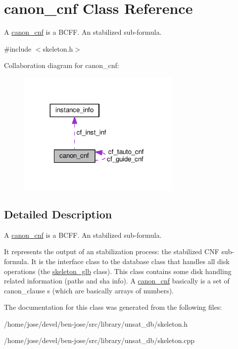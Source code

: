 \hypertarget{classcanon__cnf}{\section{canon\+\_\+cnf Class Reference}
\label{classcanon__cnf}
}


A \hyperlink{classcanon__cnf}{canon\+\_\+cnf} is a B\+C\+F\+F. An stabilized sub-\/formula.  




{\ttfamily \#include $<$skeleton.\+h$>$}



Collaboration diagram for canon\+\_\+cnf\+:\nopagebreak
\begin{figure}[H]
\begin{center}
\leavevmode
\includegraphics[width=224pt]{d3/d0b/classcanon__cnf__coll__graph}
\end{center}
\end{figure}


\subsection{Detailed Description}
A \hyperlink{classcanon__cnf}{canon\+\_\+cnf} is a B\+C\+F\+F. An stabilized sub-\/formula. 

It represents the output of an stabilization process\+: the stabilized C\+N\+F sub-\/formula. It is the interface class to the database class that handles all disk operations (the \hyperlink{classskeleton__glb}{skeleton\+\_\+glb} class). This class contains some disk handling related information (paths and sha info). A \hyperlink{classcanon__cnf}{canon\+\_\+cnf} basically is a set of canon\+\_\+clause s (which are basically arrays of numbers). 

The documentation for this class was generated from the following files\+:\begin{DoxyCompactItemize}
\item 
/home/jose/devel/ben-\/jose/src/library/unsat\+\_\+db/skeleton.\+h\item 
/home/jose/devel/ben-\/jose/src/library/unsat\+\_\+db/skeleton.\+cpp\end{DoxyCompactItemize}
